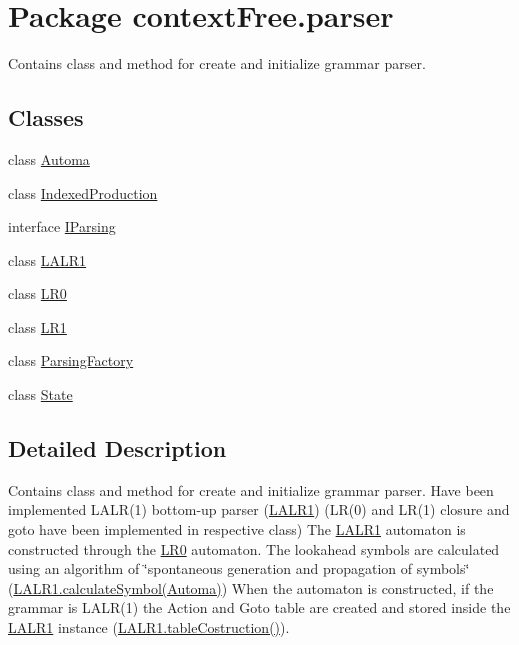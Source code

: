 \hypertarget{namespacecontext_free_1_1parser}{\section{Package context\-Free.\-parser}
\label{namespacecontext_free_1_1parser}
}


Contains class and method for create and initialize grammar parser.  


\subsection*{Classes}
\begin{DoxyCompactItemize}
\item 
class \hyperlink{classcontext_free_1_1parser_1_1_automa}{Automa}
\item 
class \hyperlink{classcontext_free_1_1parser_1_1_indexed_production}{Indexed\-Production}
\item 
interface \hyperlink{interfacecontext_free_1_1parser_1_1_i_parsing}{I\-Parsing}
\item 
class \hyperlink{classcontext_free_1_1parser_1_1_l_a_l_r1}{L\-A\-L\-R1}
\item 
class \hyperlink{classcontext_free_1_1parser_1_1_l_r0}{L\-R0}
\item 
class \hyperlink{classcontext_free_1_1parser_1_1_l_r1}{L\-R1}
\item 
class \hyperlink{classcontext_free_1_1parser_1_1_parsing_factory}{Parsing\-Factory}
\item 
class \hyperlink{classcontext_free_1_1parser_1_1_state}{State}
\end{DoxyCompactItemize}


\subsection{Detailed Description}
Contains class and method for create and initialize grammar parser. Have been implemented L\-A\-L\-R(1) bottom-\/up parser (\hyperlink{classcontext_free_1_1parser_1_1_l_a_l_r1}{L\-A\-L\-R1}) (L\-R(0) and L\-R(1) closure and goto have been implemented in respective class) The \hyperlink{classcontext_free_1_1parser_1_1_l_a_l_r1}{L\-A\-L\-R1} automaton is constructed through the \hyperlink{classcontext_free_1_1parser_1_1_l_r0}{L\-R0} automaton. The lookahead symbols are calculated using an algorithm of \char`\"{}spontaneous generation and propagation of symbols\char`\"{} (\hyperlink{classcontext_free_1_1parser_1_1_l_a_l_r1_aeec32b5c83e031225114f46ac377f804}{L\-A\-L\-R1.\-calculate\-Symbol(\-Automa)}) When the automaton is constructed, if the grammar is L\-A\-L\-R(1) the Action and Goto table are created and stored inside the \hyperlink{classcontext_free_1_1parser_1_1_l_a_l_r1}{L\-A\-L\-R1} instance (\hyperlink{classcontext_free_1_1parser_1_1_l_a_l_r1_a79576626b3b59b832faecc986b293b36}{L\-A\-L\-R1.\-table\-Costruction()}).\par


